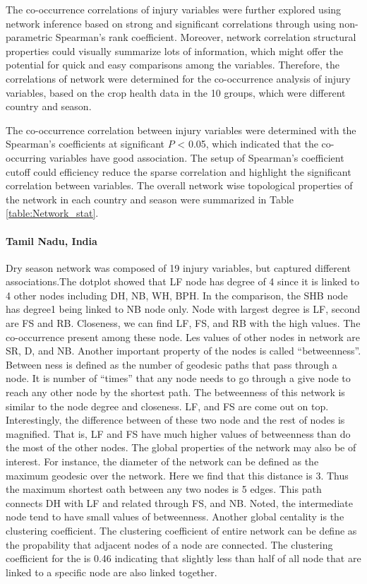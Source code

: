 The co-occurrence correlations of injury variables were further explored using network inference based on strong and significant correlations through using non-parametric Spearman’s rank coefficient. Moreover, network correlation structural properties could visually summarize lots of information, which might offer the potential for quick and easy comparisons among the variables. Therefore, the correlations of network were determined for the co-occurrence analysis of injury variables, based on the crop health data in the 10 groups, which were different country and season.

The co-occurrence correlation between injury variables were determined with the Spearman's coefficients at significant $P$ < 0.05, which indicated that the co-occurring variables have good association. The setup of Spearman's coefficient cutoff could efficiency reduce the sparse correlation and highlight the significant correlation between variables. The overall network wise topological properties of the network in each country and season were summarized in Table \ref{table:Network_stat}. 

\paragraph{Tamil Nadu, India}

Dry season network was composed of 19 injury variables, but captured different associations.The dotplot showed that LF node has degree of 4 since it is linked to 4 other nodes including DH, NB, WH, BPH. In the comparison, the SHB node has degree1 being linked to NB node only. Node with largest degree is LF, second are FS and RB. Closeness, we can find LF, FS, and RB with the high values. The co-occurrence present among these node. Les values of other nodes in network are SR, D, and NB. Another important property of the nodes is called ``betweenness''. Between ness is defined as the number of geodesic paths that pass through a node. It is number of ``times'' that any node needs to go through a give node to reach any other node by the shortest path. The betweenness of this network is similar to the node degree and closeness. LF, and FS are come out on top. Interestingly, the difference between of these two node and the rest of nodes is magnified. That is, LF and FS have much higher values of betweenness than do the most of the other nodes. The global properties of the network may also be of interest. For instance, the diameter of the network can be defined as the maximum geodesic over the network. Here we find that this distance is 3. Thus the maximum shortest oath between any two nodes is 5 edges. This path connects DH with LF and related through FS, and NB. Noted, the intermediate node tend to have small values of betweenness. Another global centality is the clustering coefficient. The clustering coefficient of entire network can be define as the propability that adjacent nodes of a node are connected. The clustering coefficient for the is 0.46 indicating that slightly less than half of all node that are linked to a specific node are also linked together.


